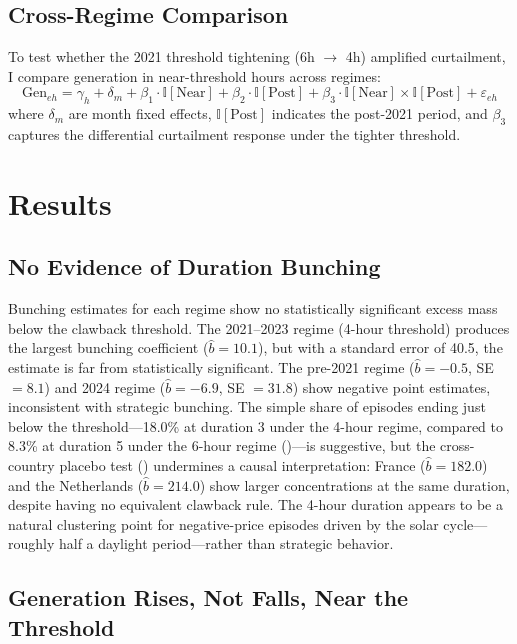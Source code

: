 \documentclass[12pt]{article}
\newcommand{\ind}{\mathbb{I}}
\begin{document}
\subsection{Cross-Regime Comparison}

To test whether the 2021 threshold tightening (6h $\to$ 4h) amplified curtailment, I compare generation in near-threshold hours across regimes:
\begin{equation}
\text{Gen}_{eh} = \gamma_h + \delta_m + \beta_1 \cdot \ind[\text{Near}] + \beta_2 \cdot \ind[\text{Post}] + \beta_3 \cdot \ind[\text{Near}] \times \ind[\text{Post}] + \varepsilon_{eh}
\end{equation}
where $\delta_m$ are month fixed effects, $\ind[\text{Post}]$ indicates the post-2021 period, and $\beta_3$ captures the differential curtailment response under the tighter threshold.


\section{Results}
\label{sec:results}

\subsection{No Evidence of Duration Bunching}

Bunching estimates for each regime show no statistically significant excess mass below the clawback threshold. The 2021--2023 regime (4-hour threshold) produces the largest bunching coefficient ($\hat{b} = 10.1$), but with a standard error of 40.5, the estimate is far from statistically significant. The pre-2021 regime ($\hat{b} = -0.5$, SE $= 8.1$) and 2024 regime ($\hat{b} = -6.9$, SE $= 31.8$) show negative point estimates, inconsistent with strategic bunching. The simple share of episodes ending just below the threshold---18.0\% at duration 3 under the 4-hour regime, compared to 8.3\% at duration 5 under the 6-hour regime ()---is suggestive, but the cross-country placebo test () undermines a causal interpretation: France ($\hat{b} = 182.0$) and the Netherlands ($\hat{b} = 214.0$) show larger concentrations at the same duration, despite having no equivalent clawback rule. The 4-hour duration appears to be a natural clustering point for negative-price episodes driven by the solar cycle---roughly half a daylight period---rather than strategic behavior.

\subsection{Generation Rises, Not Falls, Near the Threshold}
\end{document}
